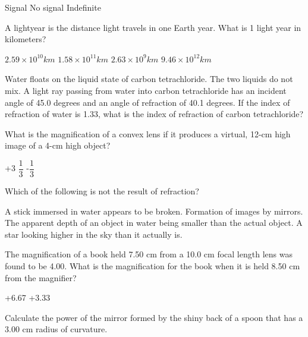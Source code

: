 \documentclass[12pt,addpoints]{exam}
\begin{document}
{{{\begin{questions}
\begin{center}
					\end{center}
					\begin{oneparchoices}
						\choice Signal
						\choice No signal
						\choice Indefinite
					\end{oneparchoices}
					\question A lightyear is the distance light travels in one Earth year. What is 1 light year in kilometers? \\
					\begin{oneparchoices}
						\choice $2.59 \times 10^{10} km$
						\choice $1.58 \times 10^{11} km$
						\choice $2.63 \times 10^{9} km$
						\choice $9.46 \times 10^{12} km$
					\end{oneparchoices}
					\question Water floats on the liquid state of carbon tetrachloride. The two liquids do not mix. A light ray passing from water into carbon tetrachloride has an incident angle of 45.0 degrees and an angle of refraction of 40.1 degrees. If the index of refraction of water is 1.33, what is the index of refraction of carbon tetrachloride?\\
					\begin{oneparchoices}
						\choice 1.60
						\choice 1.49
						\choice 1.21
						\choice 1.46
					\end{oneparchoices}	
					\question What is the magnification of a convex lens if it produces a virtual, 12-cm high image of a 4-cm high object?\\
					\begin{oneparchoices}
						\choice -3
						\choice +3
						\choice $\dfrac{1}{3}$
						\choice -$\dfrac{1}{3}$
					\end{oneparchoices} 
					\question Which of the following is not the result of refraction? 
					\begin{choices}
						\choice A stick immersed in water appears to be broken.
						\choice Formation of images by mirrors.
						\choice The apparent depth of an object in water being smaller than the actual object.
						\choice A star looking higher in the sky than it actually is.
					\end{choices}
					\question  The magnification of a book held 7.50 cm from a 10.0 cm focal length lens was found to be 4.00. What is the magnification for the book when it is held 8.50 cm from the magnifier?\\ 
					\begin{oneparchoices}
						\choice +6.67
						\choice +3.33
						\choice -6.67
						.33
					\end{oneparchoices}	
					\question Calculate the power of the mirror formed by the shiny back of a spoon that has a 3.00 cm radius of curvature. \\

\end{questions}}}}
\end{document}
